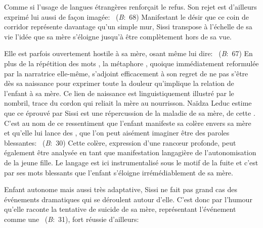 Comme si l'usage de langues étrangères renforçait le refus.
Son rejet est d'ailleurs exprimé lui aussi de façon imagée: ~(\textit{B}:~68)
Manifestant le désir que ce coin de corridor représente davantage qu'un simple mur, Sissi transpose à l'échelle de sa vie l'idée que sa mère s'éloigne jusqu'à être complètement hors de sa vue.
\par
Elle est parfois ouvertement hostile à sa mère, osant même lui dire: ~(\textit{B}:~67)
En plus de la répétition des mots , la métaphore , quoique immédiatement reformulée par la narratrice elle-même, s'adjoint efficacement à son regret de ne pas s'être  dès sa naissance pour exprimer toute la douleur qu'implique la relation de l'enfant à sa mère.
Ce lien de naissance est linguistiquement illustré par le nombril, trace du cordon qui reliait la mère au nourrisson.
Naïdza Leduc estime que ce  éprouvé par Sissi est une répercussion de la maladie de sa mère, de cette .
C'est au nom de ce ressentiment que l'enfant manifeste sa colère envers sa mère et qu'elle lui lance des , que l'on peut aisément imaginer être des paroles blessantes: ~(\textit{B}:~30)
Cette colère, expression d'une ranc\oe{}ur profonde, peut également être analysée en tant que manifestation langagière de l'autonomisation de la jeune fille.
Le langage est ici instrumentalisé sous le motif de la fuite et c'est par ses mots blessants que l'enfant s'éloigne irrémédiablement de sa mère.
\par
Enfant autonome mais aussi très adaptative, Sissi ne fait pas grand cas des événements dramatiques qui se déroulent autour d'elle.
C'est donc par l'humour qu'elle raconte la tentative de suicide de sa mère, représentant l'événement comme une ~(\textit{B}:~31), fort réussie d'ailleurs:
